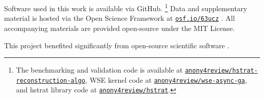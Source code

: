 Software used in this work is available via GitHub.%
\footnote{The benchmarking and validation code is available at \href{https://github.com/anony4review/hstrat-reconstruction-algo}{\texttt{anony4review/hstrat-reconstruction-algo}}, WSE kernel code at \href{https://github.com/anony4review/wse-async-ga}{\texttt{anony4review/wse-async-ga}}, and hstrat library code at \href{https://github.com/anony4review/hstrat}{\texttt{anony4review/hstrat}}.}
Data and supplementary material is hosted via the Open Science Framework at \href{https://osf.io/63ucz/?view_only=2e3ec335c016436494ad125b14ffc8cb}{\texttt{osf.io/63ucz}} \citep{supplemental,foster2017open}.
All accompanying materials are provided open-source under the MIT License.

This project benefited significantly from open-source scientific software \citep{2020SciPy-NMeth,harris2020array,reback2020pandas,mckinney2010data,waskom2021seaborn,hunter2007matplotlib,moreno2023teeplot,moreno2024downstream}.